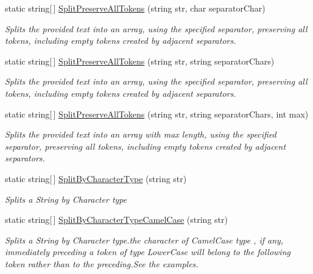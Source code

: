 \begin{DoxyCompactItemize}
static string\mbox{[}$\,$\mbox{]} \hyperlink{class_ultimate_1_1_utilities_1_1_string_utils_a5015a84534c4ebe710c5c90ffae9c350}{Split\+Preserve\+All\+Tokens} (string str, char separator\+Char)
\begin{DoxyCompactList}\small\item\em Splits the provided text into an array, using the specified separator, preserving all tokens, including empty tokens created by adjacent separators. \end{DoxyCompactList}\item 
static string\mbox{[}$\,$\mbox{]} \hyperlink{class_ultimate_1_1_utilities_1_1_string_utils_a3031ed70ec0327348228c28fac3558d3}{Split\+Preserve\+All\+Tokens} (string str, string separator\+Chars)
\begin{DoxyCompactList}\small\item\em Splits the provided text into an array, using the specified separator, preserving all tokens, including empty tokens created by adjacent separators. \end{DoxyCompactList}\item 
static string\mbox{[}$\,$\mbox{]} \hyperlink{class_ultimate_1_1_utilities_1_1_string_utils_ab4d25d854e1361d500c05e0555a08afb}{Split\+Preserve\+All\+Tokens} (string str, string separator\+Chars, int max)
\begin{DoxyCompactList}\small\item\em Splits the provided text into an array with max length, using the specified separator, preserving all tokens, including empty tokens created by adjacent separators. \end{DoxyCompactList}\item 
static string\mbox{[}$\,$\mbox{]} \hyperlink{class_ultimate_1_1_utilities_1_1_string_utils_addeaa96ea275eff0b73739121507cd99}{Split\+By\+Character\+Type} (string str)
\begin{DoxyCompactList}\small\item\em Splits a String by Character type \end{DoxyCompactList}\item 
static string\mbox{[}$\,$\mbox{]} \hyperlink{class_ultimate_1_1_utilities_1_1_string_utils_ac9d87e2397d6b9e9b490a87fd1e83a85}{Split\+By\+Character\+Type\+Camel\+Case} (string str)
\begin{DoxyCompactList}\small\item\em Splits a String by Character type.\+the character of Camel\+Case type , if any, immediately preceding a token of type Lower\+Case will belong to the following token rather than to the preceding.\+See the examples. \end{DoxyCompactList}\item 

\end{DoxyCompactItemize}
